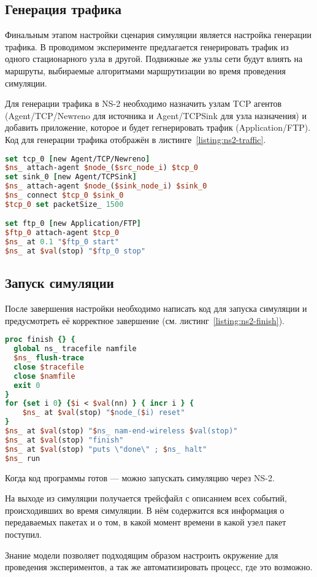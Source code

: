 \subsection{Генерация трафика}

Финальным этапом настройки сценария симуляции является настройка генерации трафика. В проводимом эксперименте предлагается генерировать трафик из одного стационарного узла в другой. Подвижные же узлы сети будут влиять на маршруты, выбираемые алгоритмами маршрутизации во время проведения симуляции.

Для генерации трафика в NS-2 необходимо назначить узлам TCP агентов (Agent/TCP/Newreno для источника и Agent/TCPSink для узла назначения) и добавить приложение, которое и будет гегнерировать трафик (Application/FTP). Код для генерации трафика отображён в листинге~\ref{listing:ns2-traffic}.

\begin{lstlisting}[language=tcl, style=mystyle, caption=Генерация трафика, label=listing:ns2-traffic]
set tcp_0 [new Agent/TCP/Newreno]
$ns_ attach-agent $node_($src_node_i) $tcp_0
set sink_0 [new Agent/TCPSink]
$ns_ attach-agent $node_($sink_node_i) $sink_0
$ns_ connect $tcp_0 $sink_0
$tcp_0 set packetSize_ 1500

set ftp_0 [new Application/FTP]
$ftp_0 attach-agent $tcp_0
$ns_ at 0.1 "$ftp_0 start"
$ns_ at $val(stop) "$ftp_0 stop"

\end{lstlisting}

\subsection{Запуск симуляции}

После завершения настройки необходимо написать код для запуска симуляции и предусмотреть её корректное завершение (см. листинг~\ref{listing:ns2-finish}).

\begin{lstlisting}[language=tcl, style=mystyle, caption=Запуск сценария и завершение, label=listing:ns2-finish]
proc finish {} {
  global ns_ tracefile namfile
  $ns_ flush-trace
  close $tracefile
  close $namfile
  exit 0
}
for {set i 0} {$i < $val(nn) } { incr i } {
    $ns_ at $val(stop) "$node_($i) reset"
}
$ns_ at $val(stop) "$ns_ nam-end-wireless $val(stop)"
$ns_ at $val(stop) "finish"
$ns_ at $val(stop) "puts \"done\" ; $ns_ halt"
$ns_ run
\end{lstlisting}

Когда код программы готов --- можно запускать симуляцию через NS-2.

На выходе из симуляции получается трейсфайл с описанием всех событий, происходивших во время симуляции. В нём содержится вся информация о передаваемых пакетах и о том, в какой момент времени в какой узел пакет поступил.

Знание модели позволяет подходящим образом настроить окружение для проведения экспериментов, а так же автоматизировать процесс, где это возможно.
 